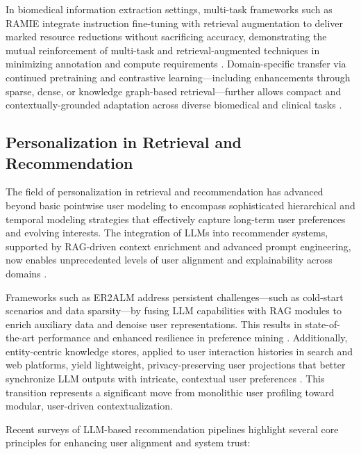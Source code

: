 In biomedical information extraction settings, multi-task frameworks such as RAMIE integrate instruction fine-tuning with retrieval augmentation to deliver marked resource reductions without sacrificing accuracy, demonstrating the mutual reinforcement of multi-task and retrieval-augmented techniques in minimizing annotation and compute requirements \cite{ref32}. Domain-specific transfer via continued pretraining and contrastive learning—including enhancements through sparse, dense, or knowledge graph-based retrieval—further allows compact and contextually-grounded adaptation across diverse biomedical and clinical tasks \cite{ref33, ref55}.

\subsection{Personalization in Retrieval and Recommendation}

The field of personalization in retrieval and recommendation has advanced beyond basic pointwise user modeling to encompass sophisticated hierarchical and temporal modeling strategies that effectively capture long-term user preferences and evolving interests. The integration of LLMs into recommender systems, supported by RAG-driven context enrichment and advanced prompt engineering, now enables unprecedented levels of user alignment and explainability across domains \cite{ref3, ref4, ref5, ref11, ref13, ref19, ref21, ref23, ref24, ref30, ref32, ref33, ref34, ref36, ref39, ref52, ref55, ref61}.

Frameworks such as ER2ALM address persistent challenges—such as cold-start scenarios and data sparsity—by fusing LLM capabilities with RAG modules to enrich auxiliary data and denoise user representations. This results in state-of-the-art performance and enhanced resilience in preference mining \cite{ref36}. Additionally, entity-centric knowledge stores, applied to user interaction histories in search and web platforms, yield lightweight, privacy-preserving user projections that better synchronize LLM outputs with intricate, contextual user preferences \cite{ref39}. This transition represents a significant move from monolithic user profiling toward modular, user-driven contextualization.

Recent surveys of LLM-based recommendation pipelines highlight several core principles for enhancing user alignment and system trust:

